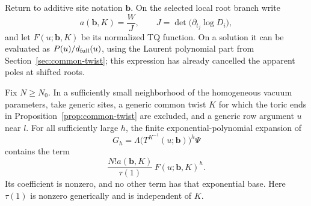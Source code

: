 Return to additive site notation \(\mathbf b\). On the selected local root branch write
\[
 a(\mathbf b,K)=\frac{W}{J},\qquad
 J=\det\bigl(\partial_{t_j}\log D_i\bigr),
\]
and let \(F(u;\mathbf b,K)\) be its normalized TQ function. On a solution it can be evaluated as \(P(u)/d_{\rm full}(u)\), using the Laurent polynomial part from Section~\ref{sec:common-twist}; this expression has already cancelled the apparent poles at shifted roots.

\begin{lemma}\label{lem:ordinary-physical-term}
Fix \(N\ge N_0\). In a sufficiently small neighborhood of the homogeneous vacuum parameters, take generic sites, a generic common twist \(K\) for which the toric ends in Proposition~\ref{prop:common-twist} are excluded, and a generic row argument \(u\) near \(l\). For all sufficiently large \(h\), the finite exponential-polynomial expansion of
\[
 G_h=\Lambda\bigl(T^{K^{-1}}(u;\mathbf b)\bigr)^h\Psi
\]
contains the term
\[
 \frac{N!a(\mathbf b,K)}{\tau(1)}\,F(u;\mathbf b,K)^h .
\]
Its coefficient is nonzero, and no other term has that exponential base. Here \(\tau(1)\) is nonzero generically and is independent of \(K\).
\end{lemma}

